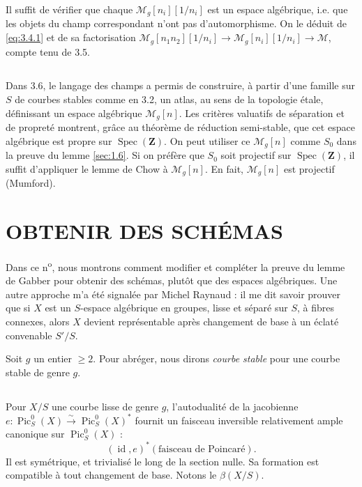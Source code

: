 \documentclass[12pt,a4paper]{article}
\theoremstyle{plain}
\theoremstyle{definition}
\theoremstyle{remark}
\DeclareMathOperator{\Pic}{Pic}
\DeclareMathOperator{\Spec}{Spec}
\DeclareMathOperator{\id}{id}
\begin{document}
Il suffit de vérifier que chaque $\mathcal{M}_g[n_i][1/n_i]$ est un espace algébrique, i.e. que les objets du champ correspondant n'ont pas d'automorphisme. On le déduit de \eqref{eq:3.4.1} et de sa factorisation $\mathcal{M}_g[n_1 n_2][1/n_i] \to \mathcal{M}_g[n_i][1/n_i] \to \mathcal{M}$, compte tenu de 3.5.

\subsection{} Dans 3.6, le langage des champs a permis de construire, à partir d'une famille sur $S$ de courbes stables comme en 3.2, un atlas, au sens de la topologie étale, définissant un espace algébrique $\mathcal{M}_g[n]$. Les critères valuatifs de séparation et de propreté montrent, grâce au théorème de réduction semi-stable, que cet espace algébrique est propre sur $\Spec(\mathbf{Z})$. On peut utiliser ce $\mathcal{M}_g[n]$ comme $S_0$ dans la preuve du lemme \ref{sec:1.6}. Si on préfère que $S_0$ soit projectif sur $\Spec(\mathbf{Z})$, il suffit d'appliquer le lemme de Chow à $\mathcal{M}_g[n]$. En fait, $\mathcal{M}_g[n]$ est projectif (Mumford).


\section{OBTENIR DES SCHÉMAS}

Dans ce n\textsuperscript{o}, nous montrons comment modifier et compléter la preuve du lemme de Gabber pour obtenir des schémas, plutôt que des espaces algébriques. Une autre approche m'a été signalée par Michel Raynaud : il me dit savoir prouver que si $X$ est un $S$-espace algébrique en groupes, lisse et séparé sur $S$, à fibres connexes, alors $X$ devient représentable après changement de base à un éclaté convenable $S'/S$.

Soit $g$ un entier $\geq 2$. Pour abréger, nous dirons \emph{courbe stable} pour une courbe stable de genre $g$.

\subsection{} Pour $X/S$ une courbe lisse de genre $g$, l'autodualité de la jacobienne $e : \Pic_S^0(X) \xrightarrow{\sim} \Pic_S^0(X)^*$ fournit un faisceau inversible relativement ample canonique sur $\Pic_S^0(X)$ :
\[
(\id,e)^*(\text{faisceau de Poincaré}).
\]
Il est symétrique, et trivialisé le long de la section nulle. Sa formation est compatible à tout changement de base. Notons le $\beta(X/S)$.
\end{document}
